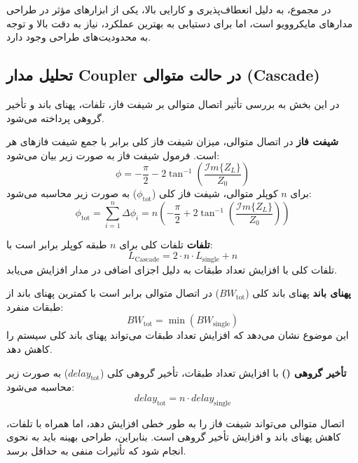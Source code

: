 \documentclass[12pt,onecolumn,a4paper]{article}
\begin{document}
\noindent در مجموع،  به دلیل انعطاف‌پذیری و کارایی بالا، یکی از ابزارهای مؤثر در طراحی مدارهای مایکروویو است، اما برای دستیابی به بهترین عملکرد، نیاز به دقت بالا و توجه به محدودیت‌های طراحی وجود دارد.



\subsection*{تحلیل مدار Coupler در حالت متوالی (Cascade)}

در این بخش به بررسی تأثیر اتصال متوالی  بر شیفت فاز، تلفات، پهنای باند و تأخیر گروهی پرداخته می‌شود.

\noindent\textbf{شیفت فاز}
در اتصال متوالی، میزان شیفت فاز کلی برابر با جمع شیفت فازهای هر  است. فرمول شیفت فاز به صورت زیر بیان می‌شود:
\begin{equation}
	\phi = -\frac{\pi}{2} - 2 \tan^{-1} \left( \frac{\mathcal{I}m \{Z_L\}}{Z_0} \right)
\end{equation}
برای \(n\) کوپلر متوالی، شیفت فاز کلی (\(\phi_\text{tot}\)) به صورت زیر محاسبه می‌شود:
\begin{equation}
	\phi_\text{tot} = \sum_{i=1}^{n} \Delta \phi_i = n \left( -\frac{\pi}{2} + 2 \tan^{-1} \left( \frac{\mathcal{I}m \{Z_L\}}{Z_0} \right) \right)
\end{equation}

\noindent\textbf{تلفات}
تلفات کلی برای \(n\) طبقه کوپلر برابر است با:
\begin{equation}
	L_\text{Cascade} = 2 \cdot n \cdot L_\text{single} + n
\end{equation}
تلفات کلی با افزایش تعداد طبقات به دلیل اجزای اضافی در مدار افزایش می‌یابد.

\noindent\textbf{پهنای باند}
پهنای باند کلی (\(BW_\text{tot}\)) در اتصال متوالی برابر است با کمترین پهنای باند از طبقات منفرد:
\begin{equation}
	BW_\text{tot} = \min (BW_\text{single})
\end{equation}
این موضوع نشان می‌دهد که افزایش تعداد طبقات می‌تواند پهنای باند کلی سیستم را کاهش دهد.

\noindent\textbf{تأخیر گروهی ()}
با افزایش تعداد طبقات، تأخیر گروهی کلی (\(delay_\text{tot}\)) به صورت زیر محاسبه می‌شود:
\begin{equation}
	delay_\text{tot} = n \cdot delay_\text{single}
\end{equation}


اتصال متوالی  می‌تواند شیفت فاز را به طور خطی افزایش دهد، اما همراه با تلفات، کاهش پهنای باند و افزایش تأخیر گروهی است. بنابراین، طراحی بهینه باید به نحوی انجام شود که تأثیرات منفی به حداقل برسد.





	\newpage
	
	\nocite{*}
	
	
\end{document}
